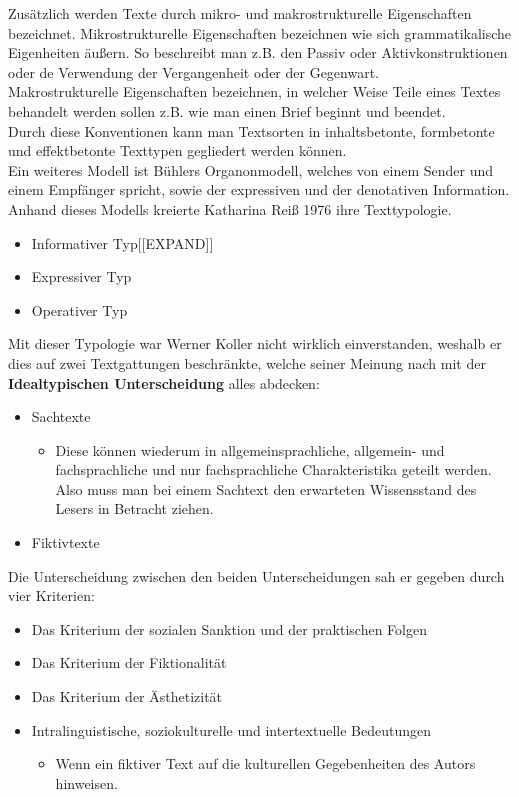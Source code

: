 \documentclass{article}
\begin{document}
	Zusätzlich werden Texte durch mikro- und makrostrukturelle Eigenschaften bezeichnet. Mikrostrukturelle Eigenschaften bezeichnen wie sich grammatikalische Eigenheiten äußern. So beschreibt man z.B. den Passiv oder Aktivkonstruktionen oder de Verwendung der Vergangenheit oder der Gegenwart. \\
	Makrostrukturelle Eigenschaften bezeichnen, in welcher Weise Teile eines Textes behandelt werden sollen z.B. wie man einen Brief beginnt und beendet. \\
	Durch diese Konventionen kann man Textsorten in inhaltsbetonte, formbetonte und effektbetonte Texttypen gegliedert werden können. \\
	Ein weiteres Modell ist Bühlers Organonmodell, welches von einem Sender und einem Empfänger spricht, sowie der expressiven und der denotativen Information. Anhand dieses Modells kreierte Katharina Reiß 1976 ihre Texttypologie. \\
	\begin{itemize}
		\item{Informativer Typ[[EXPAND]]}
		\item{Expressiver Typ}
		\item{Operativer Typ}
	\end{itemize}

	Mit dieser Typologie war Werner Koller nicht wirklich einverstanden, weshalb er dies auf zwei Textgattungen beschränkte, welche seiner Meinung nach mit der \textbf{Idealtypischen Unterscheidung} alles abdecken:
	\begin{itemize}
		\item{Sachtexte}
		\begin{itemize}
			\item{Diese können wiederum in allgemeinsprachliche, allgemein- und fachsprachliche und nur fachsprachliche Charakteristika geteilt werden. Also muss man bei einem Sachtext den erwarteten Wissensstand des Lesers in Betracht ziehen.}
		\end{itemize}
		\item{Fiktivtexte}
	\end{itemize}

	Die Unterscheidung zwischen den beiden Unterscheidungen sah er gegeben durch vier Kriterien:
	\begin{itemize}
		\item{Das Kriterium der sozialen Sanktion und der praktischen Folgen}
		\item{Das Kriterium der Fiktionalität}
		\item{Das Kriterium der Ästhetizität}
		\item{Intralinguistische, soziokulturelle und intertextuelle Bedeutungen}
		\begin{itemize}
			\item{Wenn ein fiktiver Text auf die kulturellen Gegebenheiten des Autors hinweisen.}
		\end{itemize}
	\end{itemize}
\end{document}
